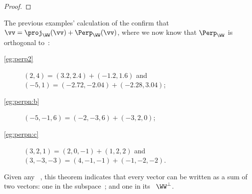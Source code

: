 \begin{reduce}
\begin{proof}
%
\end{proof}


\begin{example} 
The previous examples' calculation of the  confirm that \(\vv=\proj_\WW(\vv)+\Perp_\WW(\vv)\), where we now know that \(\Perp_\WW\) is orthogonal to~\WW:
\begin{description}
\item[\cref{eg:perp2}] \((2,4)=(3.2,2.4)+(-1.2,1.6)\) and 
\\\((-5,1)=(-2.72,-2.04)+(-2.28,3.04)\);
\item[\cref{eg:perpn:b}] \((-5,-1,6)=(-2,-3,6)+(-3,2,0)\);
\item[\cref{eg:perpn:c}] \((3,2,1)=(2,0,-1)+(1,2,2)\) and 
\\\((3,-3,-3)=(4,-1,-1)+(-1,-2,-2)\).
\end{description}
\end{example}

Given any ~\WW, this theorem indicates that every vector can be written as a sum of two vectors: one in the subspace~\WW; and one in its ~\(\WW^\perp\).



\end{reduce}
